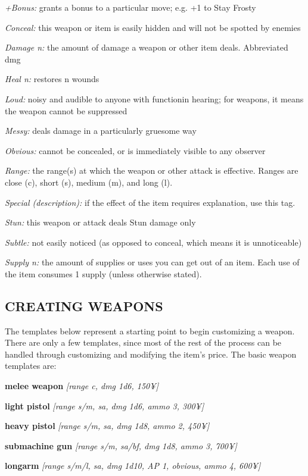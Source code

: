 \documentclass[oneside,10pt]{article}
\begin{document}
\begin{multicols}{2}
\begin{dent}
\textit{+Bonus:} grants a bonus to a particular move; e.g. +1 to
Stay Frosty

\textit{Conceal:} this weapon or item is easily hidden and will not
be spotted by enemies

\textit{Damage n:} the amount of damage a weapon or other item
deals. Abbreviated dmg

\textit{Heal n:} restores n wounds

\textit{Loud:} noisy and audible to anyone with functionin hearing;
for weapons, it means the weapon cannot be suppressed

\textit{Messy:} deals damage in a particularly gruesome way

\textit{Obvious:} cannot be concealed, or is immediately visible to
any observer

\textit{Range:} the range(s) at which the weapon or other attack is
effective. Ranges are close (c), short (s), medium (m), and
long (l).

\textit{Special (description):} if the effect of the item requires explanation, use this tag.

\textit{Stun:} this weapon or attack deals Stun damage only

\textit{Subtle:} not easily noticed (as opposed to conceal, which
means it is unnoticeable)

\textit{Supply n:} the amount of supplies or uses you can get out
of an item. Each use of the item consumes 1 supply (unless
otherwise stated).
\end{dent}

\subsection{CREATING WEAPONS}
The templates below represent a starting point to begin customizing a weapon. There are only a few templates, since
most of the rest of the process can be handled through customizing and modifying the item’s price. The basic weapon
templates are:

\textbf{melee weapon} \textit{[range c, dmg 1d6, 150¥]}

\textbf{light pistol} \textit{[range s/m, sa, dmg 1d6, ammo 3, 300¥]}

\textbf{heavy pistol} \textit{[range s/m, sa, dmg 1d8, ammo 2, 450¥]}

\textbf{submachine gun} \textit{[range s/m, sa/bf, dmg 1d8, ammo 3,
700¥]}

\textbf{longarm} \textit{[range s/m/l, sa, dmg 1d10, AP 1, obvious,
ammo 4, 600¥]}


\end{multicols}
\end{document}
